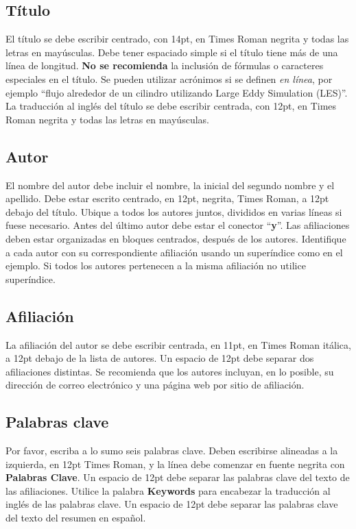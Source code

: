 \documentclass[oneside,a4paper,spanish,links]{amca}
\begin{document}
\subsection{Título}

El título se debe escribir centrado, con 14pt, en Times Roman
negrita y todas las letras en mayúsculas. Debe tener espaciado
simple si el título tiene más de una línea de longitud. \textbf{No
se recomienda} la inclusión de fórmulas o caracteres especiales en
el título. Se pueden utilizar acrónimos si se definen \emph{en
línea}, por ejemplo ``flujo alrededor de un cilindro utilizando
Large Eddy Simulation (LES)''. La traducción al inglés del título
se debe escribir centrada, con 12pt, en Times Roman negrita y
todas las letras en mayúsculas.

\subsection{Autor}

El nombre del autor debe incluir el nombre, la inicial del segundo
nombre y el apellido. Debe estar escrito centrado, en 12pt,
negrita, Times Roman, a 12pt debajo del título. Ubique a todos los
autores juntos, divididos en varias líneas si fuese necesario.
Antes del último autor debe estar el conector ``{\bf y}''. Las
afiliaciones deben estar organizadas en bloques centrados, después
de los autores. Identifique a cada autor con su correspondiente
afiliación usando un superíndice como en el ejemplo. Si todos los
autores pertenecen a la misma afiliación no utilice superíndice.

\subsection{Afiliación}

La afiliación del autor se debe escribir centrada, en 11pt, en
Times Roman itálica, a 12pt debajo de la lista de autores. Un
espacio de 12pt debe separar dos afiliaciones distintas. Se
recomienda que los autores incluyan, en lo posible, su dirección
de correo electrónico y una página web por sitio de afiliación.

\subsection{Palabras clave}

Por favor, escriba a lo sumo seis palabras clave. Deben escribirse
alineadas a la izquierda, en 12pt Times Roman, y la línea debe
comenzar en fuente negrita con {\bf Palabras Clave}. Un espacio de
12pt debe separar las palabras clave del texto de las
afiliaciones. Utilice la palabra {\bf Keywords} para encabezar la
traducción al inglés de las palabras clave. Un espacio de 12pt
debe separar las palabras clave del texto del resumen en español.
\end{document}
